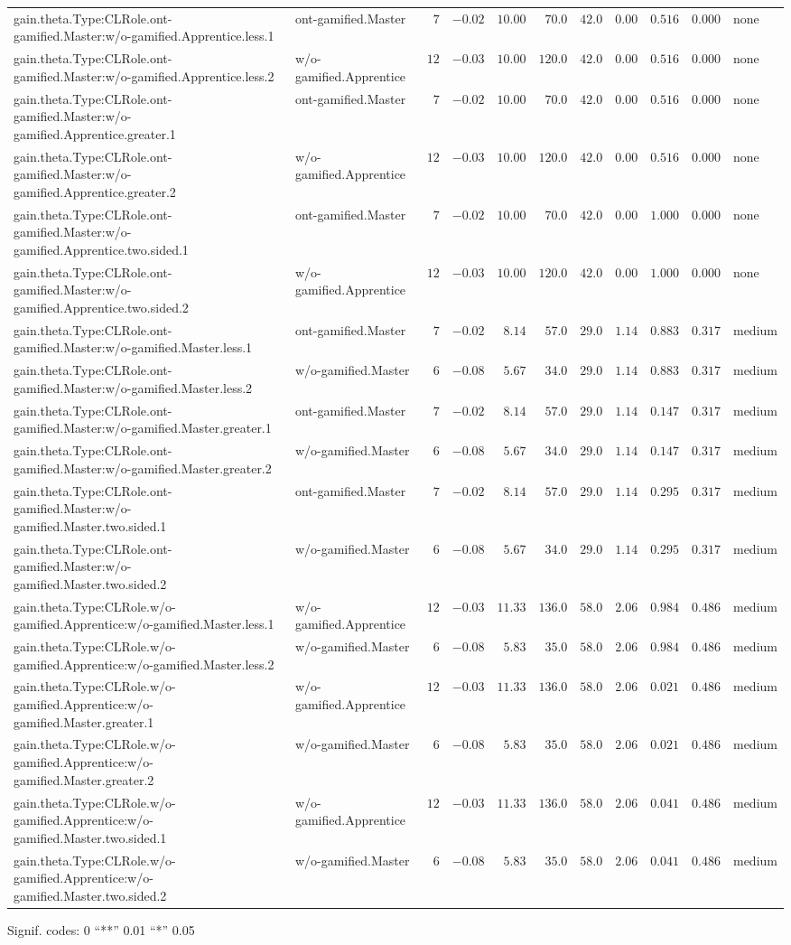 \documentclass[6pt]{article}
\begin{document}
\begin{landscape}
{\begin{longtable}{llrrrrrrrrl}
gain.theta.Type:CLRole.ont-gamified.Master:w/o-gamified.Apprentice.less.1&ont-gamified.Master&$ 7$&$-0.02$&$10.00$&$ 70.0$&$ 42.0$&$0.00$&$0.516$&$0.000$&none\tabularnewline
gain.theta.Type:CLRole.ont-gamified.Master:w/o-gamified.Apprentice.less.2&w/o-gamified.Apprentice&$12$&$-0.03$&$10.00$&$120.0$&$ 42.0$&$0.00$&$0.516$&$0.000$&none\tabularnewline
gain.theta.Type:CLRole.ont-gamified.Master:w/o-gamified.Apprentice.greater.1&ont-gamified.Master&$ 7$&$-0.02$&$10.00$&$ 70.0$&$ 42.0$&$0.00$&$0.516$&$0.000$&none\tabularnewline
gain.theta.Type:CLRole.ont-gamified.Master:w/o-gamified.Apprentice.greater.2&w/o-gamified.Apprentice&$12$&$-0.03$&$10.00$&$120.0$&$ 42.0$&$0.00$&$0.516$&$0.000$&none\tabularnewline
gain.theta.Type:CLRole.ont-gamified.Master:w/o-gamified.Apprentice.two.sided.1&ont-gamified.Master&$ 7$&$-0.02$&$10.00$&$ 70.0$&$ 42.0$&$0.00$&$1.000$&$0.000$&none\tabularnewline
gain.theta.Type:CLRole.ont-gamified.Master:w/o-gamified.Apprentice.two.sided.2&w/o-gamified.Apprentice&$12$&$-0.03$&$10.00$&$120.0$&$ 42.0$&$0.00$&$1.000$&$0.000$&none\tabularnewline
gain.theta.Type:CLRole.ont-gamified.Master:w/o-gamified.Master.less.1&ont-gamified.Master&$ 7$&$-0.02$&$ 8.14$&$ 57.0$&$ 29.0$&$1.14$&$0.883$&$0.317$&medium\tabularnewline
gain.theta.Type:CLRole.ont-gamified.Master:w/o-gamified.Master.less.2&w/o-gamified.Master&$ 6$&$-0.08$&$ 5.67$&$ 34.0$&$ 29.0$&$1.14$&$0.883$&$0.317$&medium\tabularnewline
gain.theta.Type:CLRole.ont-gamified.Master:w/o-gamified.Master.greater.1&ont-gamified.Master&$ 7$&$-0.02$&$ 8.14$&$ 57.0$&$ 29.0$&$1.14$&$0.147$&$0.317$&medium\tabularnewline
gain.theta.Type:CLRole.ont-gamified.Master:w/o-gamified.Master.greater.2&w/o-gamified.Master&$ 6$&$-0.08$&$ 5.67$&$ 34.0$&$ 29.0$&$1.14$&$0.147$&$0.317$&medium\tabularnewline
gain.theta.Type:CLRole.ont-gamified.Master:w/o-gamified.Master.two.sided.1&ont-gamified.Master&$ 7$&$-0.02$&$ 8.14$&$ 57.0$&$ 29.0$&$1.14$&$0.295$&$0.317$&medium\tabularnewline
gain.theta.Type:CLRole.ont-gamified.Master:w/o-gamified.Master.two.sided.2&w/o-gamified.Master&$ 6$&$-0.08$&$ 5.67$&$ 34.0$&$ 29.0$&$1.14$&$0.295$&$0.317$&medium\tabularnewline
gain.theta.Type:CLRole.w/o-gamified.Apprentice:w/o-gamified.Master.less.1&w/o-gamified.Apprentice&$12$&$-0.03$&$11.33$&$136.0$&$ 58.0$&$2.06$&$0.984$&$0.486$&medium\tabularnewline
gain.theta.Type:CLRole.w/o-gamified.Apprentice:w/o-gamified.Master.less.2&w/o-gamified.Master&$ 6$&$-0.08$&$ 5.83$&$ 35.0$&$ 58.0$&$2.06$&$0.984$&$0.486$&medium\tabularnewline
gain.theta.Type:CLRole.w/o-gamified.Apprentice:w/o-gamified.Master.greater.1&w/o-gamified.Apprentice&$12$&$-0.03$&$11.33$&$136.0$&$ 58.0$&$2.06$&$0.021$&$0.486$&medium\tabularnewline
gain.theta.Type:CLRole.w/o-gamified.Apprentice:w/o-gamified.Master.greater.2&w/o-gamified.Master&$ 6$&$-0.08$&$ 5.83$&$ 35.0$&$ 58.0$&$2.06$&$0.021$&$0.486$&medium\tabularnewline
\newpage
gain.theta.Type:CLRole.w/o-gamified.Apprentice:w/o-gamified.Master.two.sided.1&w/o-gamified.Apprentice&$12$&$-0.03$&$11.33$&$136.0$&$ 58.0$&$2.06$&$0.041$&$0.486$&medium\tabularnewline
gain.theta.Type:CLRole.w/o-gamified.Apprentice:w/o-gamified.Master.two.sided.2&w/o-gamified.Master&$ 6$&$-0.08$&$ 5.83$&$ 35.0$&$ 58.0$&$2.06$&$0.041$&$0.486$&medium\tabularnewline
\hline
\end{longtable}}\end{landscape}
\begin{flushright}{ \tiny{ Signif. codes:  0 ``**'' 0.01 ``*'' 0.05 }}\end{flushright} 
\end{document}
